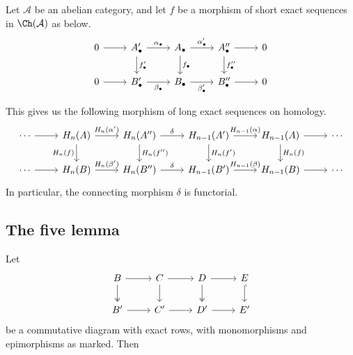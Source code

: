 \documentclass[main.tex]{subfiles}
\begin{document}
\begin{lemma}
  \label{lemma:connecting_homomorphism_is_functorial}
  Let $\mathcal{A}$ be an abelian category, and let $f$ be a morphism of short exact sequences in $\Ch(\mathcal{A})$ as below.
  \begin{equation*}
    \begin{tikzcd}
      0
      \arrow[r]
      & A'_{\bullet}
      \arrow[r, "\alpha_{\bullet}"]
      \arrow[d, "f'_{\bullet}"]
      & A_{\bullet}
      \arrow[r, "\alpha'_{\bullet}"]
      \arrow[d, "f_{\bullet}"]
      & A''_{\bullet}
      \arrow[r]
      \arrow[d, "f''_{\bullet}"]
      & 0
      \\
      0
      \arrow[r]
      & B'_{\bullet}
      \arrow[r, swap, "\beta_{\bullet}"]
      & B_{\bullet}
      \arrow[r, swap, "\beta'_{\bullet}"]
      & B''_{\bullet}
      \arrow[r]
      & 0
    \end{tikzcd}
  \end{equation*}

  This gives us the following morphism of long exact sequences on homology.
  \begin{equation*}
    \begin{tikzcd}
      \cdots
      \arrow[r]
      & H_{n}(A)
      \arrow[r, "H_{n}(\alpha')"]
      \arrow[d, swap, "H_{n}(f)"]
      & H_{n}(A'')
      \arrow[r, "\delta"]
      \arrow[d, "H_{n}(f'')"]
      & H_{n-1}(A')
      \arrow[r, "H_{n-1}(\alpha)"]
      \arrow[d, "H_{n}(f')"]
      & H_{n-1}(A)
      \arrow[d, "H_{n}(f)"]
      \arrow[r]
      & \cdots
      \\
      \cdots
      \arrow[r]
      & H_{n}(B)
      \arrow[r, "H_{n}(\beta')"]
      & H_{n}(B'')
      \arrow[r, "\delta"]
      & H_{n-1}(B')
      \arrow[r, "H_{n-1}(\beta)"]
      & H_{n-1}(B)
      \arrow[r]
      & \cdots
    \end{tikzcd}
  \end{equation*}
  In particular, the connecting morphism $\delta$ is functorial.
\end{lemma}

\subsection{The five lemma}
\label{ssc:the_five_lemma}

\begin{lemma}
  \label{lemma:four_lemmas}
  Let
  \begin{equation*}
    \begin{tikzcd}
      B
      \arrow[r]
      \arrow[d, two heads]
      & C
      \arrow[r]
      \arrow[d]
      & D
      \arrow[r]
      \arrow[d, two heads]
      & E
      \arrow[d, hook]
      \\
      B'
      \arrow[r]
      & C'
      \arrow[r]
      & D'
      \arrow[r]
      & E'
    \end{tikzcd}
  \end{equation*}
  be a commutative diagram with exact rows, with monomorphisms and epimorphisms as marked. Then 
\end{lemma}
\end{document}
